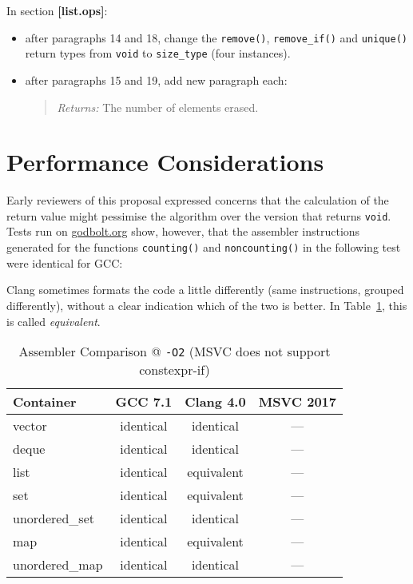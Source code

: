 \documentclass[11pt]{article}
\begin{document}
In section \textbf{[list.ops]}:

\begin{itemize}
\item after paragraphs 14 and 18, change the \texttt{remove()},
  \texttt{remove\_if()} and \texttt{unique()} return types from
  \texttt{void} to \texttt{size\_type} (four instances).
\item after paragraphs 15 and 19, add new paragraph each:
  \begin{quotation}
    \textit{Returns:} The number of elements erased.
  \end{quotation}
\end{itemize}

\section{Performance Considerations}

Early reviewers of this proposal expressed concerns that the
calculation of the return value might pessimise the algorithm over the
version that returns \texttt{void}. Tests run on \url{godbolt.org}
show, however, that the assembler instructions generated for the
functions \texttt{counting()} and \texttt{noncounting()} in the
following test were identical for GCC:



Clang sometimes formats the code a little differently (same
instructions, grouped differently), without a clear indication which
of the two is better. In Table~\ref{tab:asm}, this is called
\emph{equivalent}.

\begin{table}
  \centering
  \begin{tabular}[t]{|l||c|c|c|}
    \hline
    Container      & GCC 7.1   & Clang 4.0  & MSVC 2017 \\ \hline\hline
    vector         & identical & identical  & --- \\
    deque          & identical & identical  & --- \\
    list           & identical & equivalent & --- \\
    set            & identical & equivalent & --- \\
    unordered\_set & identical & identical  & --- \\
    map            & identical & equivalent & --- \\
    unordered\_map & identical & identical  & --- \\ \hline
  \end{tabular}
  \caption{Assembler Comparison @ \texttt{-O2} (MSVC does not support constexpr-if)}
  \label{tab:asm}
\end{table}
\end{document}
